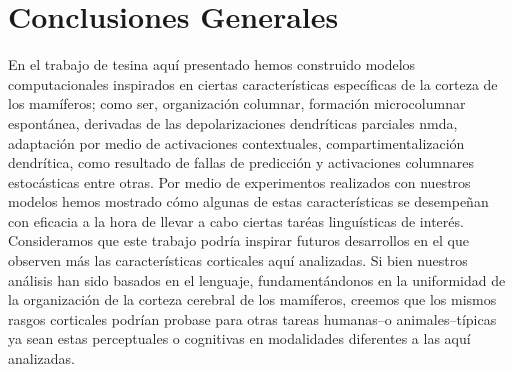 \section{Conclusiones Generales}

En el trabajo de tesina aquí presentado hemos construido modelos computacionales inspirados en ciertas características específicas de la corteza de los mamíferos; como ser, organización columnar, formación microcolumnar espontánea,  derivadas de las depolarizaciones dendríticas parciales \gls{nmda}, adaptación por medio de activaciones contextuales, compartimentalización dendrítica,  como resultado de fallas de predicción y activaciones columnares estocásticas entre otras. 
Por medio de experimentos realizados con nuestros modelos hemos mostrado cómo algunas de estas características se desempeñan con eficacia a la hora de llevar a cabo ciertas taréas linguísticas de interés.
Consideramos que este trabajo podría inspirar futuros desarrollos en el  que observen más las características corticales aquí analizadas.
Si bien nuestros análisis han sido basados en el lenguaje, fundamentándonos en la uniformidad de la organización de la corteza cerebral de los mamíferos, creemos que los mismos rasgos corticales podrían probase para otras tareas humanas--o animales--típicas ya sean estas perceptuales o cognitivas en modalidades diferentes a las aquí analizadas.



